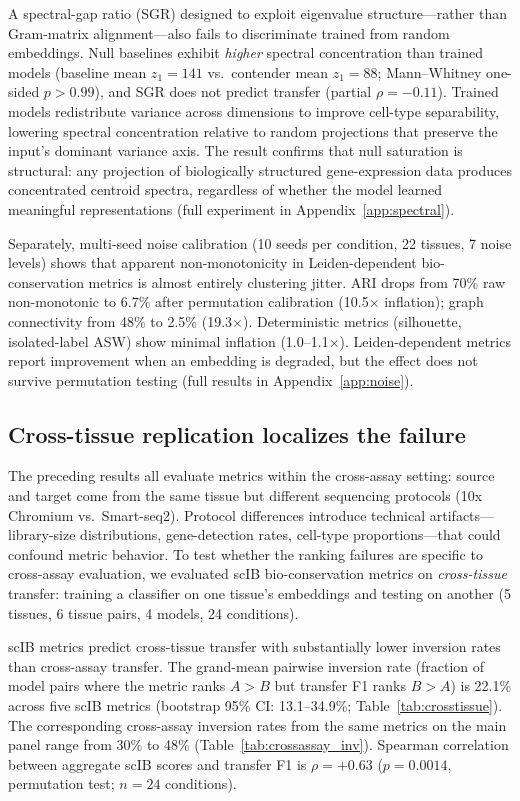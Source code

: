 \documentclass[11pt]{article}
\begin{document}
A spectral-gap ratio (SGR) designed to exploit eigenvalue
structure---rather than Gram-matrix alignment---also fails to
discriminate trained from random embeddings. Null baselines exhibit
\emph{higher} spectral concentration than trained models (baseline mean
$z_1 = 141$ vs.\ contender mean $z_1 = 88$; Mann--Whitney one-sided
$p > 0.99$), and SGR does not predict transfer (partial
$\rho = -0.11$). Trained models redistribute variance across dimensions
to improve cell-type separability, lowering spectral concentration
relative to random projections that preserve the input's dominant
variance axis. The result confirms that null saturation is structural:
any projection of biologically structured gene-expression data produces
concentrated centroid spectra, regardless of whether the model learned
meaningful representations (full experiment in
Appendix~\ref{app:spectral}).

Separately, multi-seed noise calibration (10 seeds per condition, 22
tissues, 7 noise levels) shows that apparent non-monotonicity in
Leiden-dependent bio-conservation metrics is almost entirely clustering
jitter. ARI drops from 70\% raw non-monotonic to 6.7\% after
permutation calibration (10.5$\times$ inflation); graph connectivity
from 48\% to 2.5\% (19.3$\times$). Deterministic metrics (silhouette,
isolated-label ASW) show minimal inflation (1.0--1.1$\times$).
Leiden-dependent metrics report improvement when an embedding is
degraded, but the effect does not survive permutation testing (full
results in Appendix~\ref{app:noise}).


\subsection{Cross-tissue replication localizes the failure}
\label{sec:crosstissue}

The preceding results all evaluate metrics within the cross-assay
setting: source and target come from the same tissue but different
sequencing protocols (10x Chromium vs.\ Smart-seq2). Protocol
differences introduce technical artifacts---library-size distributions,
gene-detection rates, cell-type proportions---that could confound metric
behavior. To test whether the ranking failures are specific to
cross-assay evaluation, we evaluated scIB bio-conservation metrics on
\emph{cross-tissue} transfer: training a classifier on one tissue's
embeddings and testing on another (5 tissues, 6 tissue pairs, 4 models,
24 conditions).

scIB metrics predict cross-tissue transfer with substantially lower
inversion rates than cross-assay transfer. The grand-mean pairwise
inversion rate (fraction of model pairs where the metric ranks
$A > B$ but transfer F1 ranks $B > A$) is 22.1\% across five scIB
metrics (bootstrap 95\% CI: 13.1--34.9\%;
Table~\ref{tab:crosstissue}). The corresponding cross-assay inversion
rates from the same metrics on the main panel range from 30\% to 48\%
(Table~\ref{tab:crossassay_inv}). Spearman correlation between
aggregate scIB scores and transfer F1 is $\rho = +0.63$ ($p = 0.0014$,
permutation test; $n = 24$ conditions).
\end{document}
